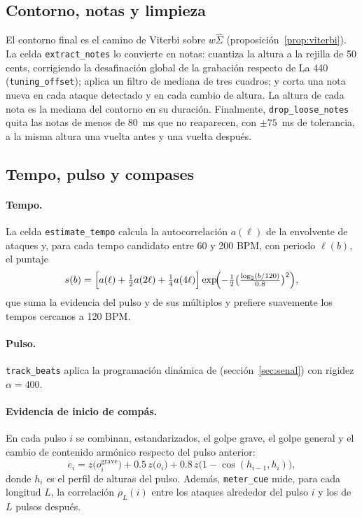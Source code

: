 \subsection{Contorno, notas y limpieza}

El contorno final es el camino de Viterbi sobre $w \hat\Sigma$ (proposición~\ref{prop:viterbi}). La celda
\texttt{extract\_notes} lo convierte en notas: cuantiza la altura a la rejilla de 50 cents, corrigiendo la desafinación
global de la grabación respecto de La 440 (\texttt{tuning\_offset}); aplica un filtro de mediana de tres cuadros; y corta
una nota nueva en cada ataque detectado y en cada cambio de altura. La altura de cada nota es la mediana del contorno en su
duración. Finalmente, \texttt{drop\_loose\_notes} quita las notas de menos de 80~ms que no reaparecen, con $\pm75$~ms de
tolerancia, a la misma altura una vuelta antes y una vuelta después.

\subsection{Tempo, pulso y compases}\label{sec:met-compases}

\paragraph{Tempo.} La celda \texttt{estimate\_tempo} calcula la autocorrelación $a(\ell)$ de la envolvente de ataques y,
para cada tempo candidato entre 60 y 200 BPM, con periodo $\ell(b)$, el puntaje
\[
  s(b) = \Bigl[a(\ell) + \tfrac12 a(2\ell) + \tfrac14 a(4\ell)\Bigr] \exp\!\Bigl(-\tfrac12 \bigl(\tfrac{\log_2(b/120)}{0.8}
  \bigr)^2\Bigr),
\]
que suma la evidencia del pulso y de sus múltiplos y prefiere suavemente los tempos cercanos a 120 BPM.

\paragraph{Pulso.} \texttt{track\_beats} aplica la programación dinámica de \citet{ellis2007} (sección~\ref{sec:senal}) con
rigidez $\alpha = 400$.

\paragraph{Evidencia de inicio de compás.} En cada pulso $i$ se combinan, estandarizados, el golpe grave, el golpe general
y el cambio de contenido armónico respecto del pulso anterior:
\[
  e_i = z\bigl(o^{\mathrm{grave}}_i\bigr) + 0.5\, z\bigl(o_i\bigr) + 0.8\, z\bigl(1 - \cos(h_{i-1}, h_i)\bigr),
\]
donde $h_i$ es el perfil de alturas del pulso. Además, \texttt{meter\_cue} mide, para cada longitud $L$, la correlación
$\rho_L(i)$ entre los ataques alrededor del pulso $i$ y los de $L$ pulsos después.

